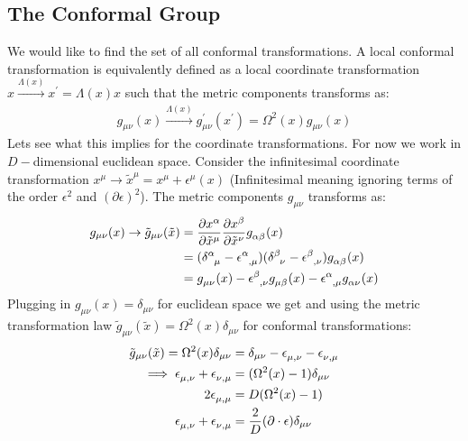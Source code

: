   \subsection{The Conformal Group}
  We would like to find the set of all conformal transformations. A local conformal transformation is equivalently defined as a local coordinate transformation $x\xrightarrow{\Lambda(x)}x^\prime = \Lambda(x)x $ such that the metric components transforms as:
  \begin{align}
   g_{\mu\nu}(x) \xrightarrow{\Lambda(x)} g^\prime_{\mu\nu}(x^\prime) = \Omega^2(x) g_{\mu\nu}(x)  \label{ch2:metrictransform}
  \end{align}
  Lets see what this implies for the coordinate transformations. For now we work in $D-$dimensional euclidean space. Consider the infinitesimal coordinate transformation $x^\mu \to \tilde{x}^\mu=x^\mu + \epsilon^\mu(x)$ (Infinitesimal meaning ignoring terms of the order $\epsilon^2$ and $(\partial \epsilon)^2$). The metric components $g_{\mu\nu}$ transforms as:
  \begin{align}
   g_{\mu\nu}(x)\to \tilde{g}_{\mu\nu}(\tilde{x}) &= \frac{\partial x^\alpha}{\partial \tilde{x}^\mu}\frac{\partial x^\beta}{\partial \tilde{x}^\nu} \tensor[]{g}{_\alpha_\beta}(x) \\
   &= (\tensor[]{\delta}{^\alpha_\mu}-\tensor[]{\epsilon}{^\alpha_{,\mu}})(\tensor[]{\delta}{^\beta_\nu}-\tensor[]{\epsilon}{^\beta_{,\nu}})\tensor[]{g}{_\alpha_\beta}(x) \\
   &= \tensor[]{g}{_\mu_\nu}(x)-\tensor[]{\epsilon}{^\beta_{,\nu}}\tensor[]{g}{_\mu_\beta}(x)-\tensor[]{\epsilon}{^\alpha_{,\mu}}\tensor[]{g}{_\alpha_\nu}(x)
  \end{align}
  Plugging in $g_{\mu\nu}(x)=\delta_{\mu\nu}$ for euclidean space we get and using the metric transformation law $\tilde{g}_{\mu\nu}(\tilde{x}) = \Omega^2(x)\delta_{\mu\nu}$ for conformal transformations:
  \begin{align}
   \tilde{g}_{\mu\nu}(\tilde{x}) = \Omega^2(x)\delta_{\mu\nu} &= \delta_{\mu\nu}-\tensor[]{\epsilon}{_\mu_{,\nu}}-\tensor[]{\epsilon}{_\nu_{,\mu}} \\
   \implies \tensor[]{\epsilon}{_\mu_{,\nu}}+\tensor[]{\epsilon}{_\nu_{,\mu}} &= (\Omega^2(x)-1)\delta_{\mu\nu} \\
   2\tensor[]{\epsilon}{_\mu_{,\mu}} &= D (\Omega^2(x)-1) \\
   \tensor[]{\epsilon}{_\mu_{,\nu}}+\tensor[]{\epsilon}{_\nu_{,\mu}} &= \frac{2}{D}(\partial \cdot \epsilon) \delta_{\mu\nu} \label{2dconclusion}  
  \end{align}
